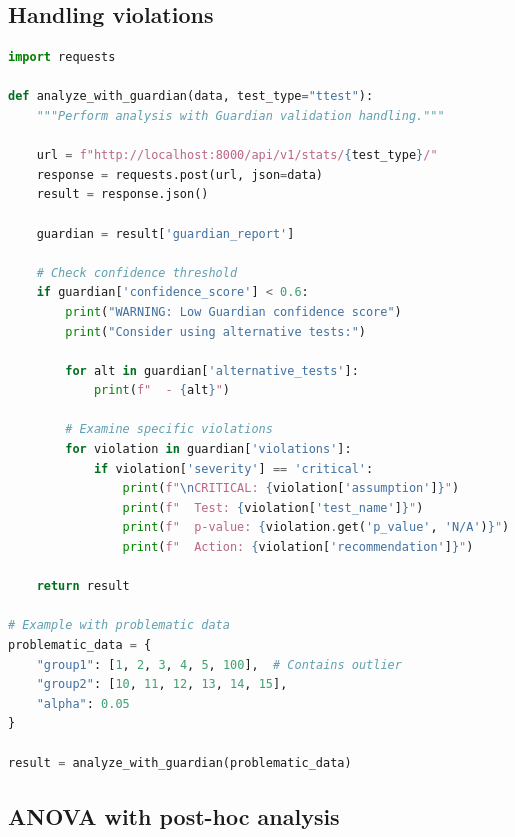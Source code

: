 \documentclass[article]{jss}
\begin{document}
\subsection{Handling violations}

\begin{lstlisting}[language=Python,caption={Handling Guardian violations}]
import requests

def analyze_with_guardian(data, test_type="ttest"):
    """Perform analysis with Guardian validation handling."""

    url = f"http://localhost:8000/api/v1/stats/{test_type}/"
    response = requests.post(url, json=data)
    result = response.json()

    guardian = result['guardian_report']

    # Check confidence threshold
    if guardian['confidence_score'] < 0.6:
        print("WARNING: Low Guardian confidence score")
        print("Consider using alternative tests:")

        for alt in guardian['alternative_tests']:
            print(f"  - {alt}")

        # Examine specific violations
        for violation in guardian['violations']:
            if violation['severity'] == 'critical':
                print(f"\nCRITICAL: {violation['assumption']}")
                print(f"  Test: {violation['test_name']}")
                print(f"  p-value: {violation.get('p_value', 'N/A')}")
                print(f"  Action: {violation['recommendation']}")

    return result

# Example with problematic data
problematic_data = {
    "group1": [1, 2, 3, 4, 5, 100],  # Contains outlier
    "group2": [10, 11, 12, 13, 14, 15],
    "alpha": 0.05
}

result = analyze_with_guardian(problematic_data)
\end{lstlisting}

\subsection{ANOVA with post-hoc analysis}
\end{document}
